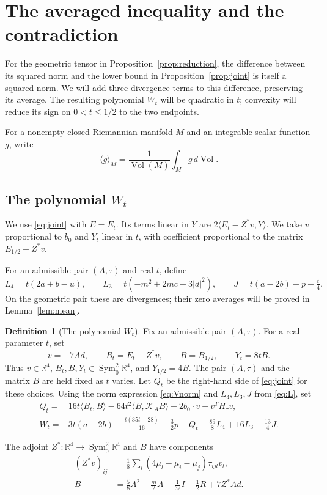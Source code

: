 \documentclass[11pt,a4paper]{amsart}
\numberwithin{equation}{section}
\theoremstyle{definition}
\newtheorem{definition}[theorem]{Definition}
\theoremstyle{remark}
\DeclareMathOperator{\Vol}{Vol}
\newcommand{\R}{\mathbb R}
\newcommand{\K}{\mathcal K}
\newcommand{\av}[1]{\langle #1\rangle_M}
\newcommand{\Szero}{\operatorname{Sym}^2_0\R^4}
\begin{document}
\section{The averaged inequality and the contradiction}\label{sec:integral}
For the geometric tensor in Proposition~\ref{prop:reduction}, the
difference between its squared norm and the lower bound in
Proposition~\ref{prop:joint} is itself a squared norm. We will add
three divergence terms to this difference, preserving its average.
The resulting polynomial $W_t$ will be quadratic in $t$; convexity
will reduce its sign on $0<t\le1/2$ to the two endpoints.

For a nonempty closed Riemannian manifold $M$ and an integrable
scalar function $g$, write
\[
 \av g=\frac1{\Vol(M)}\int_M g\,d\Vol.
\]

\subsection{The polynomial \texorpdfstring{$W_t$}{W(t)}}
We use \eqref{eq:joint} with $E=E_t$. Its terms linear in $Y$ are
$2\langle E_t-Z^*v,Y\rangle$. We take $v$ proportional to $b_0$
and $Y_t$ linear in $t$, with coefficient proportional to the matrix
$E_{1/2}-Z^*v$.

For an admissible pair $(A,\tau)$ and real $t$, define
\begin{equation}\label{eq:L}
 L_4=t(2a+b-u),\qquad
 L_3=t(-m^2+2mc+3|d|^2),\qquad
 J=t(a-2b)-p-\tfrac t4.
\end{equation}
On the geometric pair these are divergences; their zero averages
will be proved in Lemma~\ref{lem:mean}.

\begin{definition}[The polynomial $W_t$]\label{def:Wt}
Fix an admissible pair $(A,\tau)$.
For a real parameter $t$, set
\begin{equation}\label{eq:choice}
 v=-7Ad,\qquad B_t=E_t-Z^*v,\qquad
 B=B_{1/2},\qquad Y_t=8tB.
\end{equation}
Thus $v\in\R^4$, $B_t,B,Y_t\in\Szero$, and $Y_{1/2}=4B$.
The pair $(A,\tau)$ and the matrix $B$ are held fixed as $t$ varies.
Let $Q_t$ be the right-hand side of \eqref{eq:joint} for these choices.
Using the norm expression \eqref{eq:Vnorm} and $L_4,L_3,J$ from
\eqref{eq:L}, set
\begin{align}
 Q_t={}&16t\langle B_t,B\rangle-64t^2\langle B,\K_AB\rangle
               +2b_0\cdot v-v^TH_\tau v,\label{eq:Qt}\\
 W_t={}&3t(a-2b)+\frac{t(35t-28)}{16}-\tfrac32p-Q_t
              -\tfrac{89}{8}L_4+16L_3+\tfrac{13}{4}J.\label{eq:Wt}
\end{align}

The adjoint $Z^*:\R^4\to\Szero$ and $B$ have components
\begin{equation}\label{eq:Zadjoint}
 \begin{aligned}
 (Z^*v)_{ij}&=\tfrac18\sum_l(4\mu_l-\mu_i-\mu_j)\tau_{ijl}v_l,\\
 B&=\tfrac58A^2-\tfrac m2A-\tfrac1{32}I-\tfrac12R+7Z^*Ad.
 \end{aligned}
\end{equation}
\end{definition}
\end{document}
